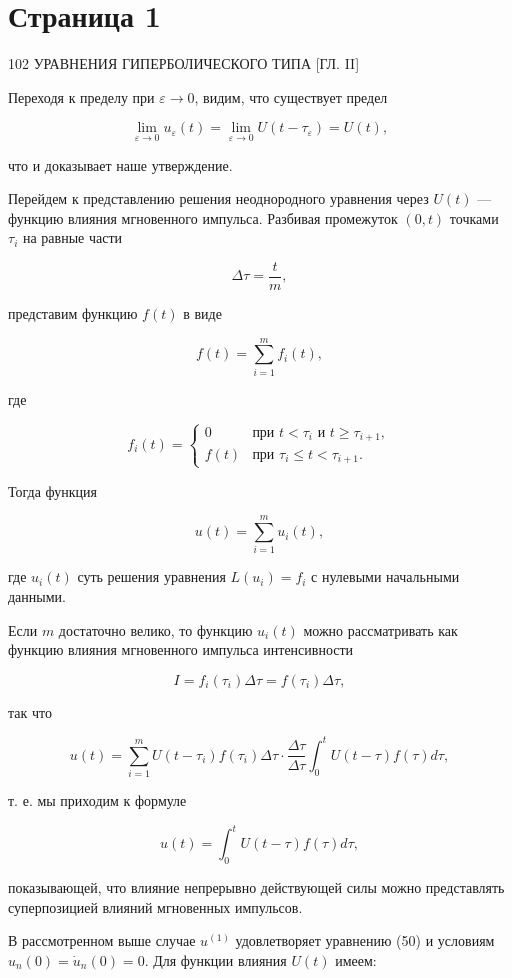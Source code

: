 \documentclass{article}
\begin{document}
\section*{Страница 1}

102 УРАВНЕНИЯ ГИПЕРБОЛИЧЕСКОГО ТИПА [ГЛ. II]

Переходя к пределу при $\varepsilon \to 0$, видим, что существует предел

\[
\lim_{\varepsilon \to 0} u_\varepsilon (t) = \lim_{\varepsilon \to 0} U \left( t - \tau_\varepsilon \right) = U(t),
\]

что и доказывает наше утверждение.

Перейдем к представлению решения неоднородного уравнения через $U(t)$ — функцию влияния мгновенного импульса. Разбивая промежуток $(0, t)$ точками $\tau_i$ на равные части

\[
\Delta \tau = \frac{t}{m},
\]

представим функцию $f(t)$ в виде

\[
f(t) = \sum_{i=1}^m f_i(t),
\]

где

\[
f_i(t) = 
\begin{cases} 
0 & \text{при } t < \tau_i \text{ и } t \geq \tau_{i+1}, \\
f(t) & \text{при } \tau_i \leq t < \tau_{i+1}.
\end{cases}
\]

Тогда функция

\[
u(t) = \sum_{i=1}^m u_i(t),
\]

где $u_i(t)$ суть решения уравнения $L(u_i) = f_i$ с нулевыми начальными данными.

Если $m$ достаточно велико, то функцию $u_i(t)$ можно рассматривать как функцию влияния мгновенного импульса интенсивности

\[
I = f_i(\tau_i) \Delta \tau = f(\tau_i) \Delta \tau,
\]

так что

\[
u(t) = \sum_{i=1}^m U \left( t - \tau_i \right) f(\tau_i) \Delta \tau \cdot \frac{\Delta \tau}{\Delta \tau} \int_0^t U \left( t - \tau \right) f(\tau) d\tau,
\]

т. е. мы приходим к формуле

\[
u(t) = \int_0^t U \left( t - \tau \right) f(\tau) d\tau,
\]

показывающей, что влияние непрерывно действующей силы можно представлять суперпозицией влияний мгновенных импульсов.

В рассмотренном выше случае $u^{(1)}$ удовлетворяет уравнению (50) и условиям $u_n(0) = \dot{u}_n(0) = 0$. Для функции влияния $U(t)$ имеем:
\end{document}
